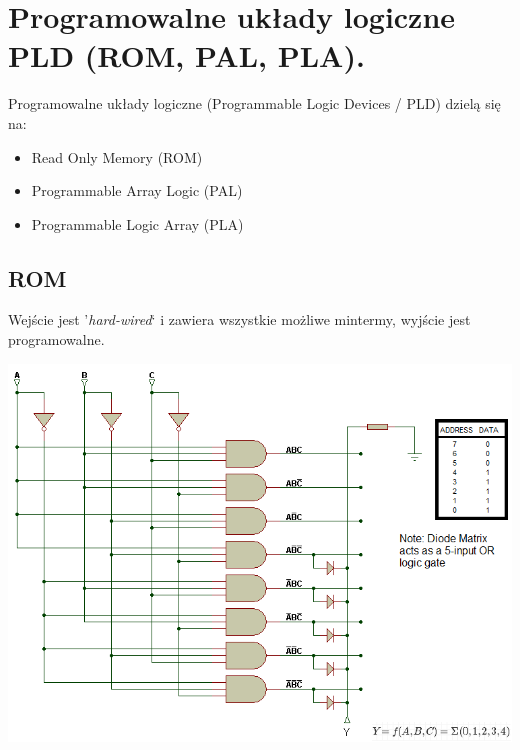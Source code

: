 \documentclass[12pt]{article}
\begin{document}
    
    \newpage
    
    \section{Programowalne układy logiczne PLD (ROM, PAL, PLA).}
    
    Programowalne układy logiczne (Programmable Logic Devices / PLD) dzielą się na:
    \begin{itemize}
        \item Read Only Memory (ROM)
        \item Programmable Array Logic (PAL)
        \item Programmable Logic Array (PLA)
    \end{itemize}
    
    \subsection{ROM}
        Wejście jest '\textit{hard-wired}` i zawiera wszystkie możliwe mintermy, wyjście jest programowalne.
            \begin{center}
                 \includegraphics[scale=0.7]{graphics/rom.png}
            \end{center}
             
\end{document}
